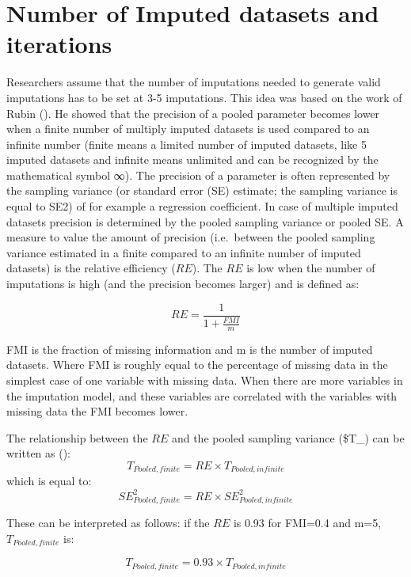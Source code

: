 \documentclass[]{book}
\begin{document}
\section{Number of Imputed datasets and
iterations}\label{number-of-imputed-datasets-and-iterations}

Researchers assume that the number of imputations needed to generate
valid imputations has to be set at 3-5 imputations. This idea was based
on the work of Rubin (\citet{Rubin1987}). He showed that the precision
of a pooled parameter becomes lower when a finite number of multiply
imputed datasets is used compared to an infinite number (finite means a
limited number of imputed datasets, like 5 imputed datasets and infinite
means unlimited and can be recognized by the mathematical symbol ∞). The
precision of a parameter is often represented by the sampling variance
(or standard error (SE) estimate; the sampling variance is equal to SE2)
of for example a regression coefficient. In case of multiple imputed
datasets precision is determined by the pooled sampling variance or
pooled SE. A measure to value the amount of precision (i.e.~between the
pooled sampling variance estimated in a finite compared to an infinite
number of imputed datasets) is the relative efficiency (\(RE\)). The
\(RE\) is low when the number of imputations is high (and the precision
becomes larger) and is defined as:

\[RE=  \frac{1}{1+ \frac{FMI}{m}}\]

FMI is the fraction of missing information and m is the number of
imputed datasets. Where FMI is roughly equal to the percentage of
missing data in the simplest case of one variable with missing data.
When there are more variables in the imputation model, and these
variables are correlated with the variables with missing data the FMI
becomes lower.

The relationship between the \(RE\) and the pooled sampling variance
(\$T\_) can be written as (\citet{VanBuuren2012}):
\[T_{Pooled,finite}=RE×T_{Pooled,infinite}\] which is equal to:
\[SE_{Pooled,finite}^2=RE×SE_{Pooled,infinite}^2 \]

These can be interpreted as follows: if the \(RE\) is 0.93 for FMI=0.4
and m=5, \(T_{Pooled,finite}\) is:

\[T_{Pooled,finite}=0.93×T_{Pooled,infinite}\]
\end{document}
